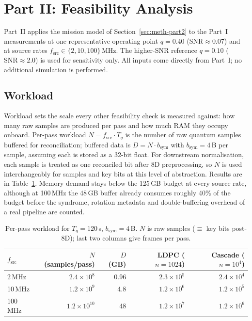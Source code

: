 \documentclass{UoYCSproject}
\begin{document}
\section{Part II: Feasibility Analysis}
\label{sec:results-part2}

Part~II applies the mission model of Section~\ref{sec:meth-part2} to the
Part~I measurements at one representative operating point $q = 0.40$
($\mathrm{SNR}\!\approx\!0.07$) and at source rates
$f_{\text{src}} \in \{2, 10, 100\}$\,MHz. The higher-SNR reference
$q = 0.10$ ($\mathrm{SNR}\!\approx\!2.0$) is used for sensitivity only. All
inputs come directly from Part~I; no additional simulation is performed.

\subsection{Workload}
\label{subsec:results-workload}

Workload sets the scale every other feasibility check is measured
against: how many raw samples are produced per pass and how much RAM
they occupy onboard. Per-pass workload $N = f_{\text{src}} \cdot T_q$ is
the number of raw quantum samples buffered for reconciliation; buffered
data is $D = N \cdot b_{\text{sym}}$ with $b_{\text{sym}} = 4$\,B per
sample, assuming each is stored as a 32-bit float. For downstream
normalisation, each sample is treated as one reconciled bit after 8D
preprocessing, so $N$ is used interchangeably for samples and key bits
at this level of abstraction. Results are in
Table~\ref{tab:part2-workload}. Memory demand stays below the 125\,GB
budget at every source rate, although at 100\,MHz the 48\,GB buffer
already consumes roughly 40\% of the budget before the syndrome,
rotation metadata and double-buffering overhead of a real pipeline are
counted.

\begin{table}[H]
    \centering
    \small
    \begin{tabular}{lrrrr}
        \toprule
        $f_{\text{src}}$ & $N$ (samples/pass) & $D$ (GB) & LDPC ($n{=}1024$) & Cascade ($n{=}10^4$)\\
        \midrule
        2\,MHz   & $2.4\!\times\!10^{8}$  & 0.96 & $2.3\!\times\!10^{5}$ & $2.4\!\times\!10^{4}$\\
        10\,MHz  & $1.2\!\times\!10^{9}$  & 4.8  & $1.2\!\times\!10^{6}$ & $1.2\!\times\!10^{5}$\\
        100\,MHz & $1.2\!\times\!10^{10}$ & 48   & $1.2\!\times\!10^{7}$ & $1.2\!\times\!10^{6}$\\
        \bottomrule
    \end{tabular}
    \caption{Per-pass workload for $T_q = 120$\,s, $b_{\text{sym}} = 4$\,B.
    $N$ is raw samples ($\equiv$ key bits post-8D); last two columns give
    frames per pass.}
    \label{tab:part2-workload}
\end{table}
\end{document}
